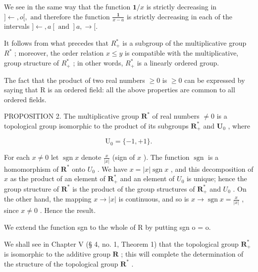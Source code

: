 We see in the same way that the function \(\mathbf{1} / x\) is strictly decreasing in \(] \leftarrow, o[, \text{ and therefore the function } \frac{\mathbf{1}}{x - a}\) is strictly decreasing in each of the intervals \(] \leftarrow, a[ \text{ and } ]a, \rightarrow [.\)

It follows from what precedes that \(R_{+}^{*}\) is a subgroup of the multiplicative group \(R^{*}\) ; moreover, the order relation \(x \leqslant y\) is compatible with the multiplicative, group structure of \(R_{+}^{*}\) ; in other words, \(R_{+}^{*}\) is a linearly ordered group.

The fact that the product of two real numbers \(\geqslant0\) is \(\geqslant0\) can be expressed by saying that R is an ordered field: all the above properties are common to all ordered fields.

PROPOSITION 2. The multiplicative group \(\mathbf{R}^{*}\) of real numbers \(\neq 0\) is a topological group isomorphic to the product of its subgroups \(\mathbf{R}_{+}^{*}\) and \(\mathbf{U}_{0}\) , where

\[
\mathrm{U} _ {0} = \{- 1, + 1 \}.
\]

For each \(x \neq 0\) let \(\operatorname{sgn} x\) denote \(\frac{x}{|x|}\) (sign of \(x\) ). The function \(\operatorname{sgn}\) is a homomorphism of \(\mathbf{R}^*\) onto \(U_0\) . We have \(x = |x| \operatorname{sgn} x\) , and this decomposition of \(x\) as the product of an element of \(\mathbf{R}_+^*\) and an element of \(U_0\) is unique; hence the group structure of \(\mathbf{R}^*\) is the product of the group structures of \(\mathbf{R}_+^*\) and \(U_0\) . On the other hand, the mapping \(x \to |x|\) is continuous, and so is \(x \to \operatorname{sgn} x = \frac{x}{|x|}\) , since \(x \neq 0\) . Hence the result.

We extend the function sgn to the whole of R by putting sgn o = o.

We shall see in Chapter V (§ 4, no. 1, Theorem 1) that the topological group \(\mathbf{R}_{+}^{*}\) is isomorphic to the additive group \(\mathbf{R}\) ; this will complete the determination of the structure of the topological group \(\mathbf{R}^{*}\) .

